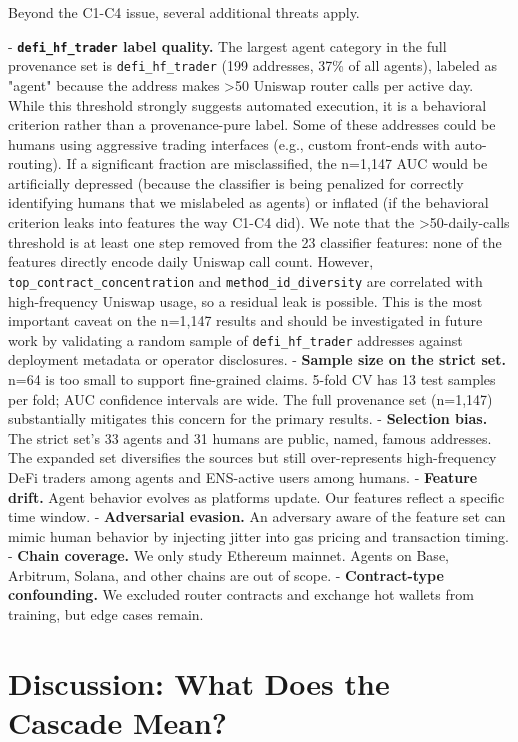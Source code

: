 \documentclass[sigconf,nonacm=false]{acmart}
\begin{document}
Beyond the C1-C4 issue, several additional threats apply.

- \textbf{\texttt{defi\_hf\_trader} label quality.} The largest agent category in the full provenance set is \texttt{defi\_hf\_trader} (199 addresses, 37\% of all agents), labeled as "agent" because the address makes >50 Uniswap router calls per active day. While this threshold strongly suggests automated execution, it is a behavioral criterion rather than a provenance-pure label. Some of these addresses could be humans using aggressive trading interfaces (e.g., custom front-ends with auto-routing). If a significant fraction are misclassified, the n=1,147 AUC would be artificially depressed (because the classifier is being penalized for correctly identifying humans that we mislabeled as agents) or inflated (if the behavioral criterion leaks into features the way C1-C4 did). We note that the >50-daily-calls threshold is at least one step removed from the 23 classifier features: none of the features directly encode daily Uniswap call count. However, \texttt{top\_contract\_concentration} and \texttt{method\_id\_diversity} are correlated with high-frequency Uniswap usage, so a residual leak is possible. This is the most important caveat on the n=1,147 results and should be investigated in future work by validating a random sample of \texttt{defi\_hf\_trader} addresses against deployment metadata or operator disclosures.
- \textbf{Sample size on the strict set.} n=64 is too small to support fine-grained claims. 5-fold CV has 13 test samples per fold; AUC confidence intervals are wide. The full provenance set (n=1,147) substantially mitigates this concern for the primary results.
- \textbf{Selection bias.} The strict set's 33 agents and 31 humans are public, named, famous addresses. The expanded set diversifies the sources but still over-represents high-frequency DeFi traders among agents and ENS-active users among humans.
- \textbf{Feature drift.} Agent behavior evolves as platforms update. Our features reflect a specific time window.
- \textbf{Adversarial evasion.} An adversary aware of the feature set can mimic human behavior by injecting jitter into gas pricing and transaction timing.
- \textbf{Chain coverage.} We only study Ethereum mainnet. Agents on Base, Arbitrum, Solana, and other chains are out of scope.
- \textbf{Contract-type confounding.} We excluded router contracts and exchange hot wallets from training, but edge cases remain.


\section{Discussion: What Does the Cascade Mean?}
\end{document}
